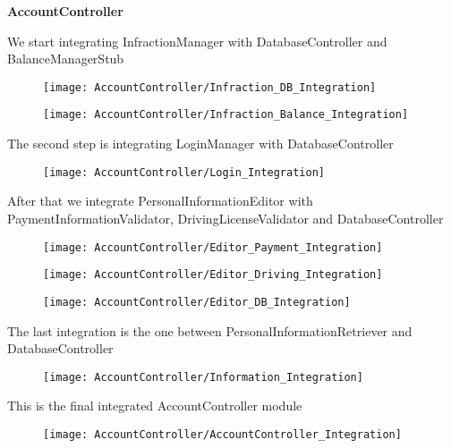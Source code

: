 \begin{Large}
\textbf{AccountController}
\end{Large}

We start integrating InfractionManager with DatabaseController and BalanceManagerStub
\begin{figure}[H]
\centering
\texttt{[image: AccountController/Infraction\_DB\_Integration]}
\end{figure}

\begin{figure}[H]
\centering
\texttt{[image: AccountController/Infraction\_Balance\_Integration]}
\end{figure}

The second step is integrating LoginManager with DatabaseController
\begin{figure}[H]
\centering
\texttt{[image: AccountController/Login\_Integration]}
\end{figure}

After that we integrate PersonalInformationEditor with PaymentInformationValidator, DrivingLicenseValidator and DatabaseController
\begin{figure}[H]
\centering
\texttt{[image: AccountController/Editor\_Payment\_Integration]}
\end{figure}

\begin{figure}[H]
\centering
\texttt{[image: AccountController/Editor\_Driving\_Integration]}
\end{figure}

\begin{figure}[H]
\centering
\texttt{[image: AccountController/Editor\_DB\_Integration]}
\end{figure}

The last integration is the one between PersonalInformationRetriever and DatabaseController
\begin{figure}[H]
\centering
\texttt{[image: AccountController/Information\_Integration]}
\end{figure}

This is the final integrated AccountController module
\begin{figure}[H]
\centering
\texttt{[image: AccountController/AccountController\_Integration]}
\end{figure}